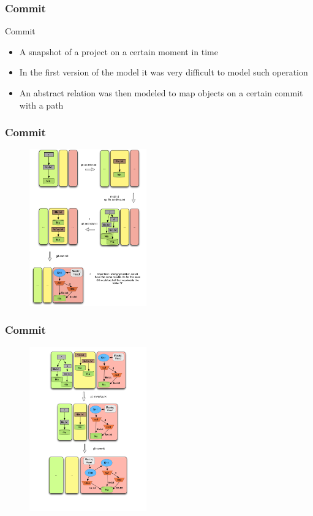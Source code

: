 \documentclass{beamer}
\begin{document}
\begin{frame}
	\frametitle{Commit}

	\begin{block}{Commit}
	\begin{itemize}
	\item A snapshot of a project on a certain moment in time
	\item In the first version of the model it was very difficult to
   model such operation
	\item An abstract relation was then modeled to map objects on a
   certain commit with a path
	\end{itemize}
	\end{block}

\end{frame}

\begin{frame}[fragile]
   \frametitle{Commit}
   \begin{figure}
      \centering
      \includegraphics[width=0.45\textwidth]{images/commit1.png}
   \end{figure}
\end{frame}

\begin{frame}[fragile]
   \frametitle{Commit}
   \begin{figure}
      \centering
      \includegraphics[width=0.45\textwidth]{images/commit2.png}
   \end{figure}
\end{frame}
\end{document}
